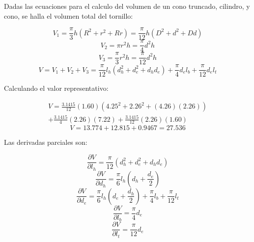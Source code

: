 \documentclass[letter,11pt]{article}
\begin{document}
Dadas las ecuaciones para el calculo del volumen de un cono truncado, cilindro,
y cono, se halla el volumen total del tornillo:

\begin{equation}
    V_1 = \frac{\pi}{3} h (R^2+r^2+Rr) = \frac{\pi}{12} h (D^2+d^2+Dd)
\tag{cono truncado}
\end{equation}
\begin{equation}
    V_2 = \pi r^2 h = \frac{\pi}{4} d^2 h
\tag{cilindro}
\end{equation}
\begin{equation}
    V_3 = \frac{\pi}{3} r^2 h = \frac{\pi}{12} d^2 h
\tag{cono}
\end{equation}
\begin{equation}
    V = V_1 + V_2 + V_3 = \frac{\pi}{12} l_h (d_h^2+d_e^2+d_h d_e) +
    \frac{\pi}{4} d_e l_b + \frac{\pi}{12} d_e l_t
\end{equation}

Calculando el valor representativo:

\begin{equation*}
\begin{split}
    V = \frac{3.1415}{12}(1.60)(4.25^2+2.26^2+(4.26)(2.26))\\
    +\frac{3.1415}{4}(2.26)(7.22)+\frac{3.1415}{12}(2.26)(1.60)
\end{split}
\end{equation*}
\begin{equation*}
    V = 13.774 + 12.815 + 0.9467 = 27.536
\end{equation*}

Las derivadas parciales son:

\begin{equation}
    \frac{\partial{V}}{\partial{l_h}}=\frac{\pi}{12}(d_h^2+d_e^2+d_h d_e)
\end{equation}
\begin{equation}
    \frac{\partial{V}}{\partial{d_h}}=\frac{\pi}{6}l_h(d_h+\frac{d_e}{2})
\end{equation}
\begin{equation}
    \frac{\partial{V}}{\partial{d_e}}=\frac{\pi}{6}l_h(d_e+\frac{d_h}{2})
    +\frac{\pi}{4}l_b+\frac{\pi}{12}l_t
\end{equation}
\begin{equation}
    \frac{\partial{V}}{\partial{l_b}} = \frac{\pi}{4} d_e
\end{equation}
\begin{equation}
    \frac{\partial{V}}{\partial{l_t}} = \frac{\pi}{12} d_e
\end{equation}
\end{document}
